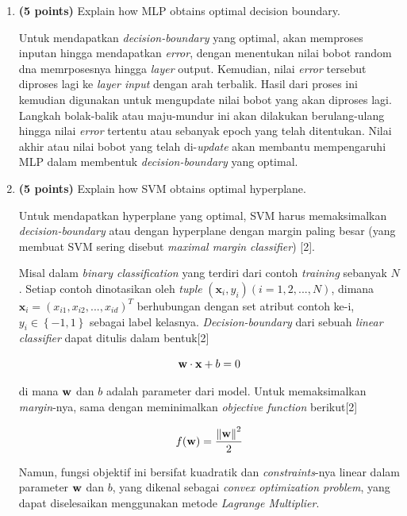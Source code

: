 \documentclass[12pt]{article}%
\begin{document}
\begin{enumerate}
	\item \textbf{(5 points)} Explain how MLP obtains optimal decision boundary.
	\par Untuk mendapatkan \textit{decision-boundary} yang optimal, akan memproses inputan hingga mendapatkan \textit{error}, dengan menentukan nilai bobot random dna memrposesnya hingga \textit{layer} output. Kemudian, nilai \textit{error} tersebut diproses lagi ke \textit{layer input} dengan arah terbalik. Hasil dari proses ini kemudian digunakan untuk mengupdate nilai bobot yang akan diproses lagi. Langkah bolak-balik atau maju-mundur ini akan dilakukan berulang-ulang hingga nilai \textit{error} tertentu atau sebanyak epoch yang telah ditentukan. Nilai akhir atau nilai bobot yang telah di-\textit{update} akan membantu mempengaruhi MLP dalam membentuk \textit{decision-boundary} yang optimal.


	\item \textbf{(5 points)} Explain how SVM obtains optimal hyperplane.
	\par Untuk mendapatkan hyperplane yang optimal, SVM harus memaksimalkan \textit{decision-boundary} atau dengan hyperplane dengan margin paling besar (yang membuat SVM sering disebut \textit{maximal margin classifier}) [2].
	\par Misal dalam \textit{binary classification} yang terdiri dari contoh \textit{training} sebanyak $N$. Setiap contoh dinotasikan oleh \textit{tuple} $(\textbf{x}_i,y_i)(i = 1,2,...,N)$, dimana $\textbf{x}_i = (x_{i1},x_{i2},...,x_{id})^T$ berhubungan dengan set atribut contoh ke-i, $y_i \in \left \{ -1 , 1 \right \}$ sebagai label kelasnya. \textit{Decision-boundary} dari sebuah \textit{linear classifier} dapat ditulis dalam bentuk[2]

	\[\textup{\textbf{w}} \cdot \textup{\textbf{x}} + b = 0\]

	\par di mana $\textup{\textbf{w}}$ dan $b$ adalah parameter dari model. Untuk memaksimalkan \textit{margin}-nya, sama dengan meminimalkan \textit{objective function} berikut[2]

	\[f(\textup{\textbf{w}} ) = \frac{\left \| \textup{\textbf{w}} \right \|^2}{2}\]

	\par Namun, fungsi objektif ini bersifat kuadratik dan \textit{constraints}-nya linear dalam parameter $\textup{\textbf{w}}$ dan $b$, yang dikenal sebagai \textit{convex optimization problem}, yang dapat diselesaikan menggunakan metode \textit{Lagrange Multiplier}.


\end{enumerate}
\end{document}
